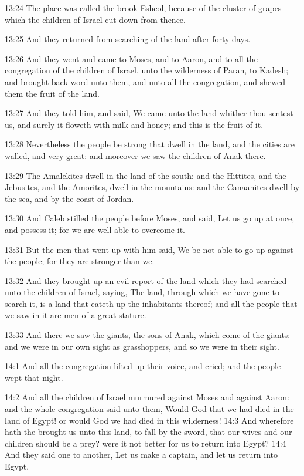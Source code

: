 13:24 The place was called the brook Eshcol, because of the cluster of grapes which the children of Israel cut down from thence.

13:25 And they returned from searching of the land after forty days.

13:26 And they went and came to Moses, and to Aaron, and to all the congregation of the children of Israel, unto the wilderness of Paran, to Kadesh; and brought back word unto them, and unto all the congregation, and shewed them the fruit of the land.

13:27 And they told him, and said, We came unto the land whither thou sentest us, and surely it floweth with milk and honey; and this is the fruit of it.

13:28 Nevertheless the people be strong that dwell in the land, and the cities are walled, and very great: and moreover we saw the children of Anak there.

13:29 The Amalekites dwell in the land of the south: and the Hittites, and the Jebusites, and the Amorites, dwell in the mountains: and the Canaanites dwell by the sea, and by the coast of Jordan.

13:30 And Caleb stilled the people before Moses, and said, Let us go up at once, and possess it; for we are well able to overcome it.

13:31 But the men that went up with him said, We be not able to go up against the people; for they are stronger than we.

13:32 And they brought up an evil report of the land which they had searched unto the children of Israel, saying, The land, through which we have gone to search it, is a land that eateth up the inhabitants thereof; and all the people that we saw in it are men of a great stature.

13:33 And there we saw the giants, the sons of Anak, which come of the giants: and we were in our own sight as grasshoppers, and so we were in their sight.

14:1 And all the congregation lifted up their voice, and cried; and the people wept that night.

14:2 And all the children of Israel murmured against Moses and against Aaron: and the whole congregation said unto them, Would God that we had died in the land of Egypt! or would God we had died in this wilderness!  14:3 And wherefore hath the \LORD brought us unto this land, to fall by the sword, that our wives and our children should be a prey? were it not better for us to return into Egypt?  14:4 And they said one to another, Let us make a captain, and let us return into Egypt.

